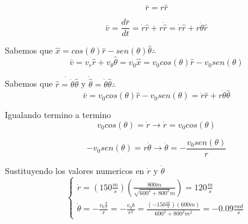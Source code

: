 \documentclass[a4paper,11pt]{scrartcl}
\begin{document}
\begin{center}

\begin{equation}
\bar{r} = r\hat{r}
\end{equation}

\begin{equation}
\bar{v} = \frac{d\bar{r}}{dt} = \dot{r}\hat{r} + r\dot{\hat{r}} = \dot{r}\hat{r} + r\dot{\theta}\hat{r}
\end{equation}

Sabemos que $\hat{x} = cos(\theta)\hat{r} - sen(\theta)\hat{\theta} \therefore$\\

\begin{equation}
\bar{v} = v_r\hat{r} + v_\theta\hat{\theta} = v_0\hat{x} = v_0 cos(\theta)\hat{r} - v_0 sen(\theta)
\end{equation}

Sabemos que $\dot{\hat{r} = \dot{\theta}\hat{\theta}}$  y $\dot{\hat{\theta}} = \dot{\theta}\hat{\theta} \therefore$\\

\begin{equation}
  \bar{v} = v_0 cos(\theta)\hat{r} - v_0 sen(\theta) = \dot{r}\hat{r} + r\dot{\theta}\hat{\theta}
\end{equation}

Igualando termino a termino\\

\begin{equation}
  v_0 cos(\theta) = \dot{r} \to \dot{r} = v_0 cos(\theta)
\end{equation}

\begin{equation}
  -v_0 sen(\theta) = r\dot{\theta} \to \dot{\theta} = -\frac{v_0 sen(\theta)}{r}
\end{equation}

Sustituyendo los valores numericos en $\dot{r}$ y $\dot{\theta}$\\

\begin{equation}
  \left\lbrace
  \begin{array}{l}
  \dot{r} = (150 \frac{m}{s})(\frac{800 m}{\sqrt{600^{2} + 800^{2}} m}) = 120 \frac{m}{s}\\
  \dot{\theta} = -\frac{v_0 \frac{b}{r}}{r} = -\frac{v_0 b}{r^{2}} = \frac{(-150\frac{m}{s})(600 m)}{600^{2} + 800^{2} m^{2}} = -0.09 \frac{rad}{s}
  \end{array}
  \right.
\end{equation}


\end{center}
\end{document}
